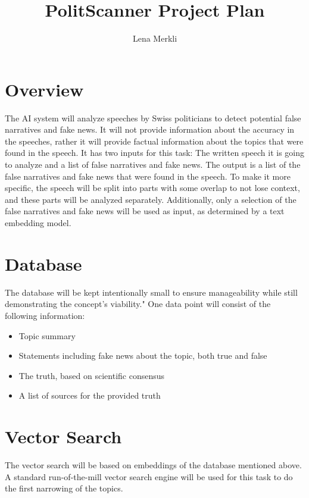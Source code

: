 \documentclass[11pt]{article}
\title{PolitScanner Project Plan}
\author{Lena Merkli}
\begin{document}
    \maketitle
    \tableofcontents

    \bigskip\bigskip

    \section{Overview}\label{sec:overview}
    The AI system will analyze speeches by Swiss politicians to detect potential false narratives and fake news.
    It will not provide information about the accuracy in the speeches, rather it will provide factual information about the topics that were found in the speech.
    It has two inputs for this task: The written speech it is going to analyze and a list of false narratives and fake news.
    The output is a list of the false narratives and fake news that were found in the speech.
    To make it more specific, the speech will be split into parts with some overlap to not lose context, and these parts will be analyzed separately.
    Additionally, only a selection of the false narratives and fake news will be used as input, as determined by a text embedding model.

    \section{Database}\label{sec:database}
    The database will be kept intentionally small to ensure manageability while still demonstrating the concept's viability."
    One data point will consist of the following information:
    \begin{itemize}
        \item Topic summary
        \item Statements including fake news about the topic, both true and false
        \item The truth, based on scientific consensus
        \item A list of sources for the provided truth
    \end{itemize}

    \section{Vector Search}\label{sec:vector_search}
    The vector search will be based on embeddings of the database mentioned above.
    A standard run-of-the-mill vector search engine will be used for this task to do the first narrowing of the topics.
\end{document}
